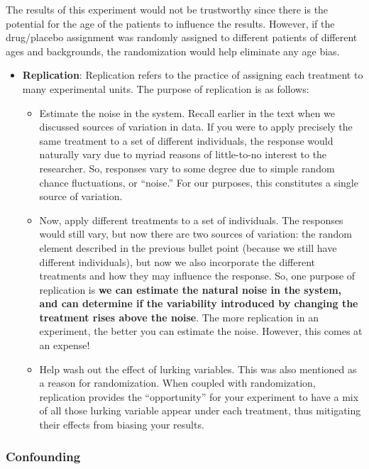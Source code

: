 \documentclass[
]{book}
\providecommand{\tightlist}{%
  \setlength{\itemsep}{0pt}\setlength{\parskip}{0pt}}
\begin{document}
The results of this experiment would not be trustworthy since there is the potential for the age of the patients to influence the results. However, if the drug/placebo assignment was randomly assigned to different patients of different ages and backgrounds, the randomization would help eliminate any age bias.

\begin{itemize}
\item
  \textbf{Replication}: Replication refers to the practice of assigning each treatment to many experimental units. The purpose of replication is as follows:

  \begin{itemize}
  \tightlist
  \item
    Estimate the noise in the system. Recall earlier in the text when we discussed sources of variation in data. If you were to apply precisely the same treatment to a set of different individuals, the response would naturally vary due to myriad reasons of little-to-no interest to the researcher. So, responses vary to some degree due to simple random chance fluctuations, or ``noise.'' For our purposes, this constitutes a single source of variation.
  \item
    Now, apply different treatments to a set of individuals. The responses would still vary, but now there are two sources of variation: the random element described in the previous bullet point (because we still have different individuals), but now we also incorporate the different treatments and how they may influence the response. So, one purpose of replication is \textbf{we can estimate the natural noise in the system, and can determine if the variability introduced by changing the treatment rises above the noise}. The more replication in an experiment, the better you can estimate the noise. However, this comes at an expense!
  \item
    Help wash out the effect of lurking variables. This was also mentioned as a reason for randomization. When coupled with randomization, replication provides the ``opportunity'' for your experiment to have a mix of all those lurking variable appear under each treatment, thus mitigating their effects from biasing your results.
  \end{itemize}
\end{itemize}

\hypertarget{confounding}{%
\subsubsection{Confounding}\label{confounding}}
\end{document}

